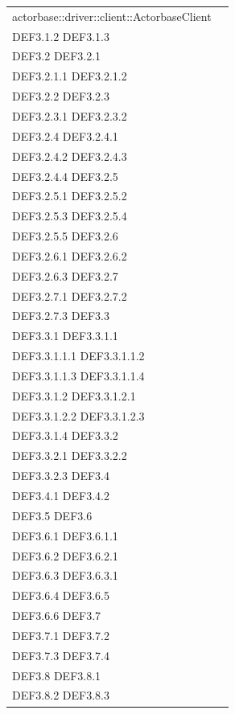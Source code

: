 \documentclass{scalatekids-article}
\begin{document}
\begin{longtable}[H]{|p{12cm}|p{5.5cm}|}
  actorbase::driver::client::ActorbaseClient & \multiLineCell[t]{DEF3.1 DEF3.1.1\\DEF3.1.2 DEF3.1.3\\DEF3.2 DEF3.2.1\\DEF3.2.1.1 DEF3.2.1.2\\DEF3.2.2 DEF3.2.3\\DEF3.2.3.1 DEF3.2.3.2\\DEF3.2.4 DEF3.2.4.1\\DEF3.2.4.2 DEF3.2.4.3\\DEF3.2.4.4 DEF3.2.5\\DEF3.2.5.1 DEF3.2.5.2\\DEF3.2.5.3 DEF3.2.5.4\\DEF3.2.5.5 DEF3.2.6\\DEF3.2.6.1 DEF3.2.6.2\\DEF3.2.6.3 DEF3.2.7\\DEF3.2.7.1 DEF3.2.7.2\\DEF3.2.7.3 DEF3.3\\DEF3.3.1 DEF3.3.1.1\\DEF3.3.1.1.1 DEF3.3.1.1.2\\DEF3.3.1.1.3 DEF3.3.1.1.4\\DEF3.3.1.2 DEF3.3.1.2.1\\DEF3.3.1.2.2 DEF3.3.1.2.3\\DEF3.3.1.4 DEF3.3.2\\DEF3.3.2.1 DEF3.3.2.2\\DEF3.3.2.3 DEF3.4\\DEF3.4.1 DEF3.4.2\\DEF3.5 DEF3.6\\DEF3.6.1 DEF3.6.1.1\\DEF3.6.2 DEF3.6.2.1\\DEF3.6.3 DEF3.6.3.1\\DEF3.6.4 DEF3.6.5\\DEF3.6.6 DEF3.7\\DEF3.7.1 DEF3.7.2\\DEF3.7.3 DEF3.7.4\\DEF3.8 DEF3.8.1\\DEF3.8.2 DEF3.8.3}\\
  \hline

\end{longtable}
\end{document}
